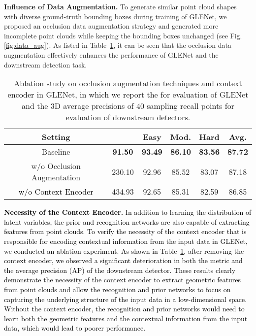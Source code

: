 \documentclass[twocolumn]{svjour3}
\newcommand{\revise}[1]{\textcolor{black}{#1}}
\begin{document}
\noindent\textbf{Influence of Data Augmentation.} To generate similar point cloud shapes with diverse ground-truth bounding boxes during training of GLENet, we proposed an occlusion data augmentation strategy and generated more incomplete point clouds while keeping the bounding boxes unchanged (see Fig. \ref{fig:data_aug}).
As listed in Table~\ref{table:data_aug}, it can be seen that the occlusion data augmentation effectively enhances the performance of GLENet and the downstream detection task.\\ 


\setlength{\tabcolsep}{2.8pt}
\begin{table}
	\centering
	\caption{Ablation study on occlusion augmentation techniques \revise{and context encoder} in GLENet, in which we report the  for evaluation of GLENet and the 3D average precisions of 40 sampling recall points for evaluation of downstream detectors.}
	\label{table:data_aug}
	\begin{tabular}{c|c|cccc} 
		\toprule
		Setting                    &  & Easy  & Mod.  & Hard  & Avg.   \\ 
		\hline
		Baseline                   & \textbf{91.50}  & \textbf{93.49} & \textbf{86.10} & \textbf{83.56} & \textbf{87.72}  \\
		w/o Occlusion Augmentation & 230.10 & 92.96 & 85.52 & 83.07 & 87.18  \\
		\revise{w/o Context Encoder}        & 434.93 & 92.65 & 85.31 & 82.59 & 86.85  \\
		\bottomrule
	\end{tabular}
\end{table}

\setlength{\tabcolsep}{1.5pt}

\noindent
\revise{
	\textbf{Necessity of the Context Encoder.} 
In addition to learning the distribution of latent variables, the prior and recognition networks are also capable of extracting features from point clouds.
	To verify the necessity of the context encoder that is responsible for encoding contextual information from the input data in GLENet, we conducted an ablation experiment. 
As shown in Table~\ref{table:data_aug}, after removing the context encoder, we observed a significant deterioration in both the  metric and the average precision (AP) of the downstream detector. 
	These results clearly demonstrate the necessity of the context encoder to extract geometric features from point clouds and allow the recognition and prior networks to focus on capturing the underlying structure of the input data in a low-dimensional space. Without the context encoder, the recognition and prior networks would need to learn both the geometric features and the contextual information from the input data, which would lead to poorer performance.
}\\
\end{document}
